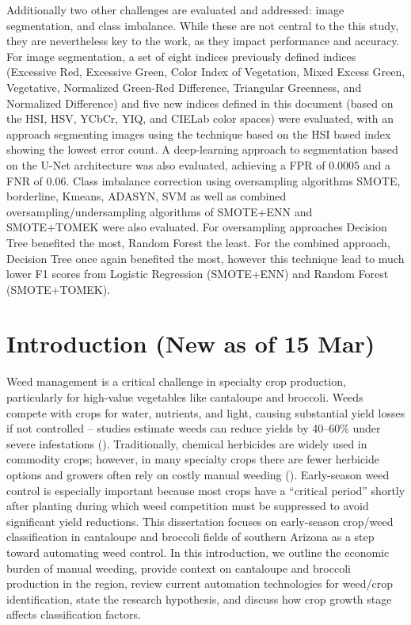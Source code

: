 \documentclass[letterpaper]{report}
\begin{document}
Additionally two other challenges are evaluated and addressed: image segmentation, and class imbalance. While these are not central to the this study, they are nevertheless key to the work, as they impact performance and accuracy.  For image segmentation, a set of eight indices previously defined indices (Excessive Red, Excessive Green, Color Index of Vegetation, Mixed Excess Green, Vegetative, Normalized Green-Red Difference, Triangular Greenness, and Normalized Difference) and five new indices defined in this document (based on the HSI, HSV, YCbCr, YIQ, and CIELab color spaces) were evaluated, with an approach segmenting images using the technique based on the HSI based index showing the lowest error count. A deep-learning approach to segmentation based on the U-Net architecture was also evaluated, achieving a \gls{FPR} of $0.0005$ and a \gls{FNR} of $0.06$. 
Class imbalance correction using oversampling algorithms \gls{SMOTE}, borderline, Kmeans, \gls{ADASYN}, \gls{SVM} as well as combined oversampling/undersampling algorithms of SMOTE+\gls{ENN} and SMOTE+TOMEK were also evaluated. For oversampling approaches Decision Tree benefited the most, Random Forest the least. For the combined approach, Decision Tree once again benefited the most, however this technique lead to much lower F1 scores from Logistic Regression (SMOTE+ENN) and Random Forest (SMOTE+TOMEK).

\newpage
%
%

\chapter{Introduction (New as of 15 Mar)}
Weed management is a critical challenge in specialty crop production, particularly for high-value vegetables like cantaloupe and broccoli. Weeds compete with crops for water, nutrients, and light, causing substantial yield losses if not controlled – studies estimate weeds can reduce yields by 40–60\% under severe infestations (\cite{Garibaldi-Marquez2022-yn}). Traditionally, chemical herbicides are widely used in commodity crops; however, in many specialty crops there are fewer herbicide options and growers often rely on costly manual weeding (\cite{American-Society-of-Agronomy2018-ad}). Early-season weed control is especially important because most crops have a “critical period” shortly after planting during which weed competition must be suppressed to avoid significant yield reductions. This dissertation focuses on early-season crop/weed classification in cantaloupe and broccoli fields of southern Arizona as a step toward automating weed control. In this introduction, we outline the economic burden of manual weeding, provide context on cantaloupe and broccoli production in the region, review current automation technologies for weed/crop identification, state the research hypothesis, and discuss how crop growth stage affects classification factors.
\end{document}
